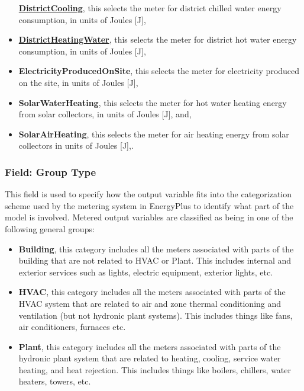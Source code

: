 \begin{itemize}
  \textbf{\hyperref[districtcooling]{DistrictCooling}}, this selects the meter for district chilled water energy consumption, in units of Joules {[}J{]},
\item
  \textbf{\hyperref[districtheating]{DistrictHeatingWater}}, this selects the meter for district hot water energy consumption, in units of Joules {[}J{]},
\item
  \textbf{ElectricityProducedOnSite}, this selects the meter for electricity produced on the site, in units of Joules {[}J{]},
\item
  \textbf{SolarWaterHeating}, this selects the meter for hot water heating energy from solar collectors, in units of Joules {[}J{]}, and,
\item
  \textbf{SolarAirHeating}, this selects the meter for air heating energy from solar collectors in units of Joules {[}J{]},.
\end{itemize}

\subsubsection{Field: Group Type}\label{field-group-type}

This field is used to specify how the output variable fits into the categorization scheme used by the metering system in EnergyPlus to identify what part of the model is involved. Metered output variables are classified as being in one of the following general groups:

\begin{itemize}
\item
  \textbf{Building}, this category includes all the meters associated with parts of the building that are not related to HVAC or Plant. This includes internal and exterior services such as lights, electric equipment, exterior lights, etc.
\item
  \textbf{HVAC}, this category includes all the meters associated with parts of the HVAC system that are related to air and zone thermal conditioning and ventilation (but not hydronic plant systems). This includes things like fans, air conditioners, furnaces etc.
\item
  \textbf{Plant}, this category includes all the meters associated with parts of the hydronic plant system that are related to heating, cooling, service water heating, and heat rejection. This includes things like boilers, chillers, water heaters, towers, etc.
\end{itemize}

